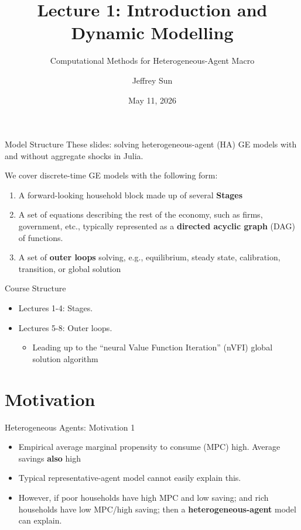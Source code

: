 \documentclass[10pt,aspectratio=169]{beamer}
\title{Lecture 1: Introduction and Dynamic Modelling}
\subtitle{Computational Methods for Heterogeneous-Agent Macro}
\author{Jeffrey Sun}
\institute{University of Toronto}
\date{May 11, 2026}
\begin{document}
\maketitle

\begin{frame}{Model Structure}
  These slides: solving heterogeneous-agent (HA) GE models with and without aggregate shocks in Julia.

  We cover discrete-time GE models with the following form:
  \begin{enumerate}
    \item A forward-looking household block made up of several \textbf{Stages}
    \item A set of equations describing the rest of the economy, such as firms, government, etc., typically represented as a \textbf{directed acyclic graph} (DAG) of functions.
    \item A set of \textbf{outer loops} solving, e.g., equilibrium, steady state, calibration, transition, or global solution
  \end{enumerate}
\end{frame}

\begin{frame}{Course Structure}
  \begin{itemize}
    \item Lectures 1-4: Stages.
    \item Lectures 5-8: Outer loops.
    \begin{itemize}
      \item Leading up to the ``neural Value Function Iteration'' (nVFI) global solution algorithm
    \end{itemize}
  \end{itemize}
\end{frame}

\section{Motivation}

\begin{frame}{Heterogeneous Agents: Motivation 1}
  \begin{itemize}
    \item Empirical average marginal propensity to consume (MPC) high. Average savings \textbf{also} high
    \item Typical representative-agent model cannot easily explain this.
    \item However, if poor households have high MPC and low saving; and rich households have low MPC/high saving; then a \textbf{heterogeneous-agent} model can explain.
  \end{itemize}
\end{frame}
\end{document}
